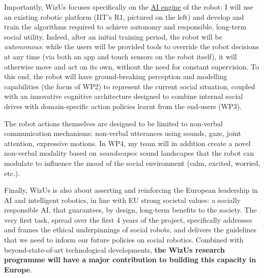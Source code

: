 \documentclass[11pt,a4paper]{report}
\newcommand{\project}{WizUs\xspace}
\begin{document}
Importantly, \project focuses specifically on the \ul{AI engine} of the robot: I
will use an existing robotic platform (IIT's R1, pictured on the left) and
develop and train the algorithms required to achieve autonomy and responsible,
long-term social utility. Indeed, after an initial training period, the robot will
be \emph{autonomous}: while the users will be provided tools to override
the robot decisions at any time (via both an app and touch sensors on the robot
itself), it will otherwise move and act on its own, without the need for
constant supervision. To this end, the robot will have ground-breaking
perception and modelling capabilities (the focus of WP2) to represent the
current social situation, coupled with an innovative cognitive architecture
designed to combine internal social drives with domain-specific action policies
learnt from the end-users (WP3).

The robot actions themselves are designed to be limited to non-verbal
communication mechanisms: non-verbal utterances using sounds, gaze, joint
attention, expressive motions. In WP4, my team will in addition create a novel
non-verbal modality based on \emph{soundscapes}: sound landscapes that the robot
can modulate to influence the mood of the social environment (calm, excited,
worried, etc.).

Finally, \project is also about asserting and reinforcing the European
leadership in AI and intelligent robotics, in line with EU strong societal
values: a socially responsible AI, that guarantees, by design, long-term
benefits to the society. The very first task, spread over the first 4 years of
the project, specifically addresses and frames the ethical underpinnings of
social robots, and delivers the guidelines that we need to inform our future
policies on social robotics. Combined with beyond-state-of-art technological
developments, \textbf{the \project research programme will
have a major contribution to building this capacity in Europe}. 
\end{document}
